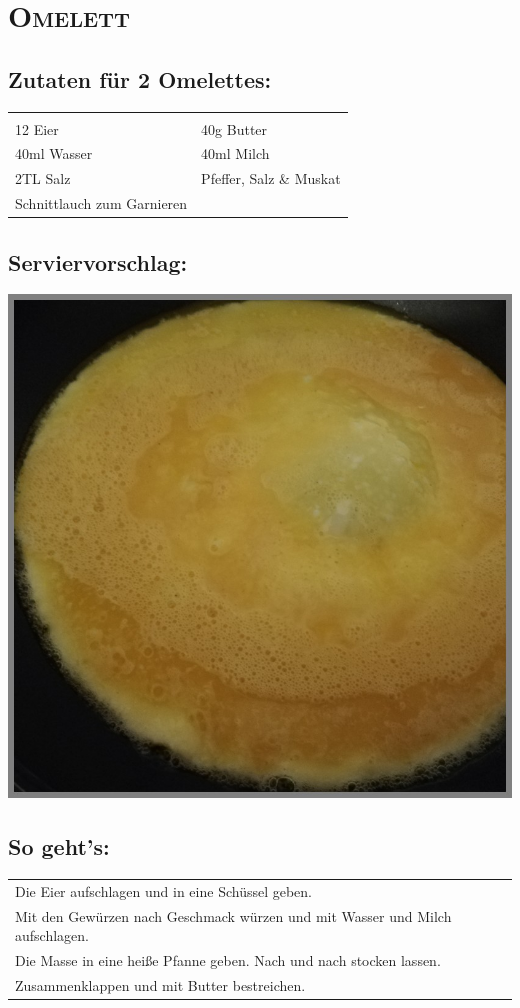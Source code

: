 \section{\textsc{Omelett}}

\subsection*{Zutaten für 2 Omelettes:}

\begin{tabular}{p{7.5cm} p{7.5cm}}
	& \\
	12 Eier & 40g Butter \\
	40ml Wasser & 40ml Milch \\
  2TL Salz & Pfeffer, Salz \& Muskat \\
  Schnittlauch zum Garnieren &
\end{tabular}

\subsection*{Serviervorschlag:}

\includegraphics[width=\textwidth]{img/omlett.jpg} \cite{omlett}

\subsection*{So geht's:}

\begin{tabular}{p{15cm}}
	\\
  Die Eier aufschlagen und in eine Schüssel geben.\\
  Mit den Gewürzen nach Geschmack würzen und mit Wasser und Milch aufschlagen. \\
  Die Masse in eine heiße Pfanne geben. Nach und nach stocken lassen.\\
  Zusammenklappen und mit Butter bestreichen.
\end{tabular}
